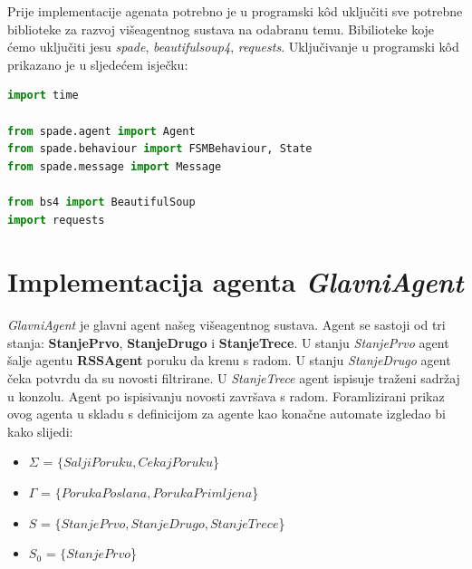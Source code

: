 \documentclass[]{foi} %
\begin{document}
Prije implementacije agenata potrebno je u programski kôd uključiti sve potrebne biblioteke za razvoj višeagentnog sustava na odabranu temu. Bibilioteke koje ćemo uključiti jesu \textit{spade}, \textit{beautifulsoup4}, \textit{requests}. Uključivanje u programski kôd prikazano je u sljedećem isječku:

\begin{lstlisting}[language=Python, caption={Potrebne biblioteke}]
import time

from spade.agent import Agent
from spade.behaviour import FSMBehaviour, State
from spade.message import Message

from bs4 import BeautifulSoup
import requests
\end{lstlisting}

\section{Implementacija agenta \textit{GlavniAgent}}
\textit{GlavniAgent} je glavni agent našeg višeagentnog sustava. Agent se sastoji od tri stanja: \textbf{StanjePrvo}, \textbf{StanjeDrugo} i \textbf{StanjeTrece}. U stanju \textit{StanjePrvo} agent šalje agentu \textbf{RSSAgent} poruku da krenu s radom. U stanju \textit{StanjeDrugo} agent čeka potvrdu da su novosti filtrirane. U \textit{StanjeTrece} agent ispisuje traženi sadržaj u konzolu. Agent po ispisivanju novosti završava s radom. Foramlizirani prikaz ovog agenta u skladu s definicijom za agente kao konačne automate izgledao bi kako slijedi:

\begin{itemize}
  \item \(\Sigma\) = $\{SaljiPoruku, CekajPoruku$\}
  \item \(\Gamma\) = $\{PorukaPoslana, PorukaPrimljena$\}
  \item \(S\) = $\{StanjePrvo, StanjeDrugo, StanjeTrece$\}
  \item \(S_0\) = $\{StanjePrvo$\}
\end{itemize}
\end{document}
